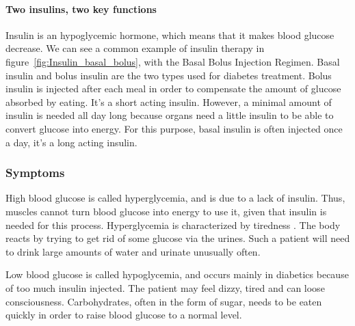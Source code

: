 \paragraph{Two insulins, two key functions}
Insulin is an hypoglycemic hormone, which means that it makes blood glucose decrease. 
We can see a common example of insulin therapy in figure~\ref{fig:Insulin_basal_bolus}, with the Basal Bolus Injection Regimen.
Basal insulin and bolus insulin are the two types used for diabetes treatment. Bolus insulin is injected after each meal in order to compensate the amount of glucose absorbed by eating. It's a short acting insulin. However, a minimal amount of insulin is needed all day long because organs need a little insulin to be able to convert glucose into energy. For this purpose, basal insulin is often injected once a day, it's a long acting insulin.

\subsubsection{Symptoms}
High blood glucose is called hyperglycemia, and is due to a lack of insulin. Thus, muscles cannot turn blood glucose into energy to use it, given that insulin is needed for this process. Hyperglycemia is characterized by %
tiredness . The body reacts by trying to get rid of some glucose via the urines. Such a patient will need to drink large amounts of water and urinate unusually often. 

Low blood glucose is called hypoglycemia, and occurs mainly in diabetics because of too much insulin injected. The patient may feel dizzy, tired and can loose consciousness. Carbohydrates, often in the form of sugar, needs to be eaten quickly in order to raise blood glucose to a normal level.  


